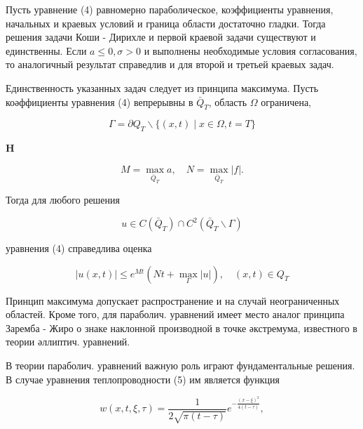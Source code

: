 \documentclass[10pt]{article}
\begin{document}
Пусть уравнение (4) равномерно параболическое, коэффициенты уравнения, начальных и краевых условий и граница области достаточно гладки. Тогда решения задачи Коши - Дирихле и первой краевой задачи существуют и единственны. Если $a \leqslant 0, \sigma>0$ и выполнены необходимые условия согласования, то аналогичный результат справедлив и для второй и третьей краевых задач.



Единственность указанных задач следует из принципа максимума. Пусть коәффициенты уравнения (4) вепрерывны в $\bar{Q}_{T}$, область $\Omega$ ограничена,



\[

\Gamma=\partial Q_{T} \backslash\{(x, t) \mid x \in \Omega, t=T\}

\]



$\mathbf{H}$



\[

M=\max _{\bar{Q}_{T}} a, \quad N=\max _{\bar{Q}_{T}}|f| .

\]



Тогда для любого решения



\[

u \in C\left(\bar{Q}_{T}\right) \cap C^{2}\left(\bar{Q}_{T} \backslash \Gamma\right)

\]



уравнения (4) справедлива оценка



\[

|u(x, t)| \leqslant e^{M t}\left(N t+\max _{\Gamma}|u|\right), \quad(x, t) \in Q_{T}

\]



Принцип максимума допускает распространение и на случай неограниченных областей. Кроме того, для параболич. уравнений имеет место аналог принципа Заремба - Жиро о знаке наклонной производной в точке әкстремума, известного в теории әллиптич. уравнений.



В теории параболич. уравнений важную роль играют фундаментальные решения. В случае уравнения теплопроводности (5) им является функция



\[

w(x, t, \xi, \tau)=\frac{1}{2 \sqrt{\pi(t-\tau)}} e^{-\frac{(x-\xi)^{2}}{4(t-\tau)}},

\]
\end{document}
